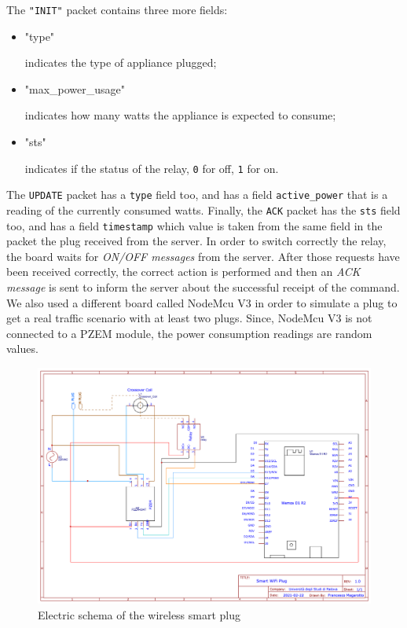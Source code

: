 \documentclass[conference]{IEEEtran}
\begin{document}
The \verb|"INIT"| packet contains three more fields:
\begin{itemize}
	\item \begin{spverbatim}"type"\end{spverbatim} indicates the type of appliance plugged;
	\item \begin{spverbatim}"max_power_usage"\end{spverbatim} indicates how many watts the appliance is expected to consume;
	\item \begin{spverbatim}"sts"\end{spverbatim} indicates if the status of the relay, \verb|0| for off, \verb|1| for on.
\end{itemize}
The \verb|UPDATE| packet has a \verb|type| field too, and has a field \verb|active_power| that is a reading of the currently consumed watts. Finally, the \verb|ACK| packet has the \verb|sts| field too, and has a field \verb|timestamp| which value is taken from the same field in the packet the plug received from the server.
In order to switch correctly the relay, the board waits for \textit{ON/OFF messages} from the server. After those requests have been received correctly, the correct action is performed and then an \textit{ACK message} is sent to inform the server about the successful receipt of the command. 
We also used a different board called NodeMcu V3 in order to simulate a plug to get a real traffic scenario with at least two plugs. Since, NodeMcu V3 is not connected to a PZEM module, the power consumption readings are random values.  
\begin{figure}[htbp]
	\centering
	\includegraphics[width=\linewidth]{assets/pcb_schema}
	\caption{Electric schema of the wireless smart plug}
	\label{fig:pcbschema}
\end{figure}
\end{document}
